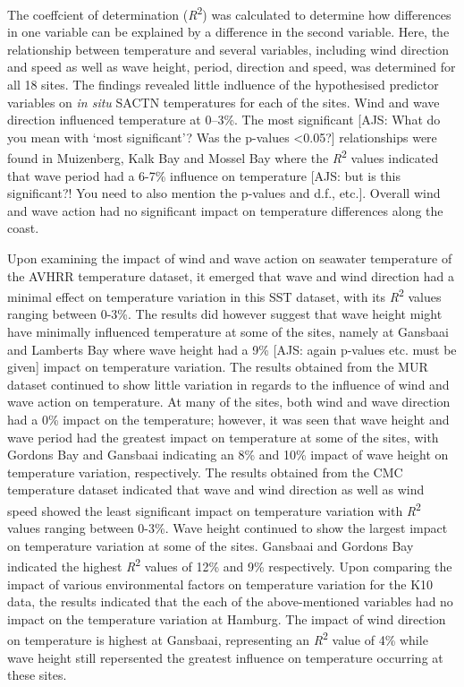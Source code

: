 \documentclass[12pt,a4paper,]{article}
\begin{document}
The coeffcient of determination (\emph{R}\textsuperscript{2}) was
calculated to determine how differences in one variable can be explained
by a difference in the second variable. Here, the relationship between
temperature and several variables, including wind direction and speed as
well as wave height, period, direction and speed, was determined for all
18 sites. The findings revealed little indluence of the hypothesised
predictor variables on \emph{in situ} SACTN temperatures for each of the
sites. Wind and wave direction influenced temperature at 0--3\%. The
most significant {[}AJS: What do you mean with `most significant'? Was
the p-values \textless{}0.05?{]} relationships were found in Muizenberg,
Kalk Bay and Mossel Bay where the \emph{R}\textsuperscript{2} values
indicated that wave period had a 6-7\% influence on temperature {[}AJS:
but is this significant?! You need to also mention the p-values and
d.f., etc.{]}. Overall wind and wave action had no significant impact on
temperature differences along the coast.

Upon examining the impact of wind and wave action on seawater
temperature of the AVHRR temperature dataset, it emerged that wave and
wind direction had a minimal effect on temperature variation in this SST
dataset, with its \emph{R}\textsuperscript{2} values ranging between
0-3\%. The results did however suggest that wave height might have
minimally influenced temperature at some of the sites, namely at
Gansbaai and Lamberts Bay where wave height had a 9\% {[}AJS: again
p-values etc. must be given{]} impact on temperature variation. The
results obtained from the MUR dataset continued to show little variation
in regards to the influence of wind and wave action on temperature. At
many of the sites, both wind and wave direction had a 0\% impact on the
temperature; however, it was seen that wave height and wave period had
the greatest impact on temperature at some of the sites, with Gordons
Bay and Gansbaai indicating an 8\% and 10\% impact of wave height on
temperature variation, respectively. The results obtained from the CMC
temperature dataset indicated that wave and wind direction as well as
wind speed showed the least significant impact on temperature variation
with \emph{R}\textsuperscript{2} values ranging between 0-3\%. Wave
height continued to show the largest impact on temperature variation at
some of the sites. Gansbaai and Gordons Bay indicated the highest
\emph{R}\textsuperscript{2} values of 12\% and 9\% respectively. Upon
comparing the impact of various environmental factors on temperature
variation for the K10 data, the results indicated that the each of the
above-mentioned variables had no impact on the temperature variation at
Hamburg. The impact of wind direction on temperature is highest at
Gansbaai, representing an \emph{R}\textsuperscript{2} value of 4\% while
wave height still repersented the greatest influence on temperature
occurring at these sites.
\end{document}
